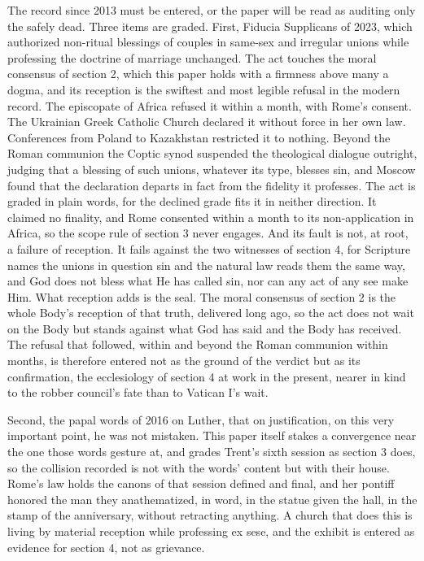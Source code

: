 \documentclass[11pt,twoside]{article}
\newcommand{\unit}[1]{\needspace{3\baselineskip}\par\medskip{\normalfont\bfseries\color{subhead}#1}\par\nobreak\smallskip}
\begin{document}
\unit{The present pontificates, graded.}
The record since 2013 must be entered, or the paper will be read as auditing only the safely dead. Three items are graded. First, Fiducia Supplicans of 2023, which authorized non-ritual blessings of couples in same-sex and irregular unions while professing the doctrine of marriage unchanged. The act touches the moral consensus of section 2, which this paper holds with a firmness above many a dogma, and its reception is the swiftest and most legible refusal in the modern record. The episcopate of Africa refused it within a month, with Rome's consent. The Ukrainian Greek Catholic Church declared it without force in her own law. Conferences from Poland to Kazakhstan restricted it to nothing. Beyond the Roman communion the Coptic synod suspended the theological dialogue outright, judging that a blessing of such unions, whatever its type, blesses sin, and Moscow found that the declaration departs in fact from the fidelity it professes. The act is graded in plain words, for the declined grade fits it in neither direction. It claimed no finality, and Rome consented within a month to its non-application in Africa, so the scope rule of section 3 never engages. And its fault is not, at root, a failure of reception. It fails against the two witnesses of section 4, for Scripture names the unions in question sin and the natural law reads them the same way, and God does not bless what He has called sin, nor can any act of any see make Him. What reception adds is the seal. The moral consensus of section 2 is the whole Body's reception of that truth, delivered long ago, so the act does not wait on the Body but stands against what God has said and the Body has received. The refusal that followed, within and beyond the Roman communion within months, is therefore entered not as the ground of the verdict but as its confirmation, the ecclesiology of section 4 at work in the present, nearer in kind to the robber council's fate than to Vatican I's wait.

Second, the papal words of 2016 on Luther, that on justification, on this very important point, he was not mistaken. This paper itself stakes a convergence near the one those words gesture at, and grades Trent's sixth session as section 3 does, so the collision recorded is not with the words' content but with their house. Rome's law holds the canons of that session defined and final, and her pontiff honored the man they anathematized, in word, in the statue given the hall, in the stamp of the anniversary, without retracting anything. A church that does this is living by material reception while professing ex sese, and the exhibit is entered as evidence for section 4, not as grievance.
\end{document}
